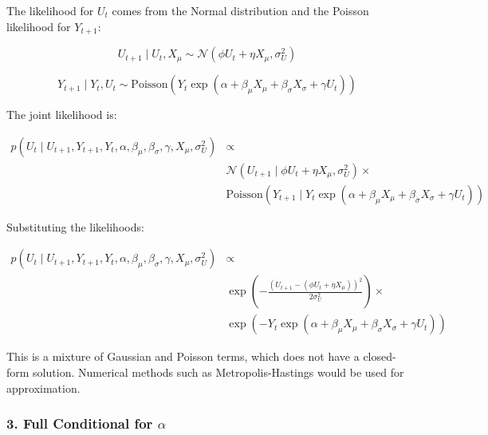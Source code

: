 \documentclass[
  letterpaper,
  DIV=11,
  numbers=noendperiod]{scrartcl}
\begin{document}
The likelihood for \(U_t\) comes from the Normal distribution and the
Poisson likelihood for \(Y_{t+1}\):

\begin{equation}
U_{t+1} \mid U_t, X_{\mu} \sim \mathcal{N}(\phi U_t + \eta X_{\mu}, \sigma_U^2)
\end{equation}

\begin{equation}
Y_{t+1} \mid Y_t, U_t \sim \text{Poisson}(Y_t \exp(\alpha + \beta_{\mu} X_{\mu} + \beta_{\sigma} X_{\sigma} + \gamma U_t))
\end{equation}

The joint likelihood is:

\begin{equation}
\begin{split}
p(U_t \mid U_{t+1}, Y_{t+1}, Y_t, \alpha, \beta_{\mu}, \beta_{\sigma}, \gamma, X_{\mu}, \sigma_U^2) & \propto \\
& \mathcal{N}(U_{t+1} \mid \phi U_t + \eta X_{\mu}, \sigma_U^2) \times \\
& \text{Poisson}(Y_{t+1} \mid Y_t \exp(\alpha + \beta_{\mu} X_{\mu} + \beta_{\sigma} X_{\sigma} + \gamma U_t))
\end{split}
\end{equation}

Substituting the likelihoods:

\begin{equation}
\begin{split}
p(U_t \mid U_{t+1}, Y_{t+1}, Y_t, \alpha, \beta_{\mu}, \beta_{\sigma}, \gamma, X_{\mu}, \sigma_U^2) &\propto \\
& \exp\left( -\frac{(U_{t+1} - (\phi U_t + \eta X_{\mu}))^2}{2 \sigma_U^2} \right) \times \\
& \exp\left( -Y_t \exp(\alpha + \beta_{\mu} X_{\mu} + \beta_{\sigma} X_{\sigma} + \gamma U_t) \right)
\end{split}
\end{equation}

This is a mixture of Gaussian and Poisson terms, which does not have a
closed-form solution. Numerical methods such as Metropolis-Hastings
would be used for approximation.

\subsubsection{\texorpdfstring{3. Full Conditional for
\(\alpha\)}{3. Full Conditional for \textbackslash alpha}}\label{full-conditional-for-alpha}
\end{document}
